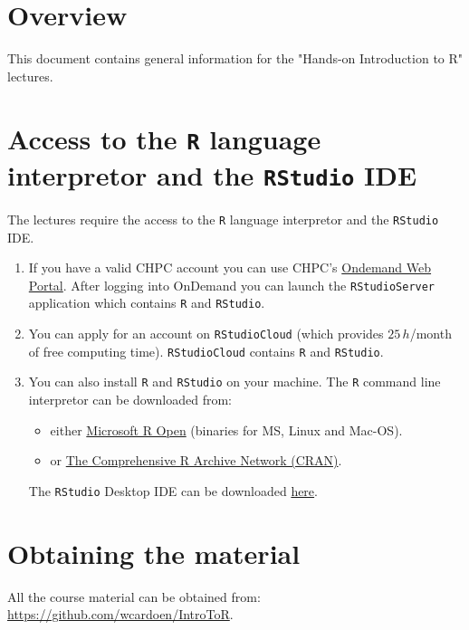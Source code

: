 \section*{Overview}

This document contains general information for the "Hands-on Introduction to R" lectures.\newline

\section{Access to the \texttt{R} language interpretor and the \texttt{RStudio} IDE}

The lectures require the access to the \texttt{R} language interpretor and the \texttt{RStudio} IDE.

\begin{enumerate}
\item If you have a valid CHPC account you can use CHPC's \href{http://ondemand.chpc.utah.edu/}{Ondemand Web Portal}.\newline
      After logging into OnDemand you can launch the \texttt{RStudioServer} application which contains \texttt{R} and \texttt{RStudio}.

\item You can apply for an account on \texttt{RStudioCloud} (which provides $25\,h$/month of free computing time).\newline
      \texttt{RStudioCloud} contains \texttt{R} and \texttt{RStudio}. 

\item You can also install \texttt{R} and \texttt{RStudio} on your machine.\newline
      The \texttt{R} command line interpretor can be downloaded from:
      \begin{itemize}
	      \item either \href{https://mran.microsoft.com/}{Microsoft R Open} (binaries for MS, Linux and Mac-OS).
  	 \item or \href{https://cran.r-project.org/}{The Comprehensive R Archive Network (CRAN)}.
      \end{itemize}			

      The \texttt{RStudio} Desktop IDE can be downloaded \href{https://www.rstudio.com/products/rstudio/download/}{here}.

\end{enumerate}



\section{Obtaining the material}
All the course material can be obtained from: \href{https://github.com/wcardoen/IntroToR}{https://github.com/wcardoen/IntroToR}.


